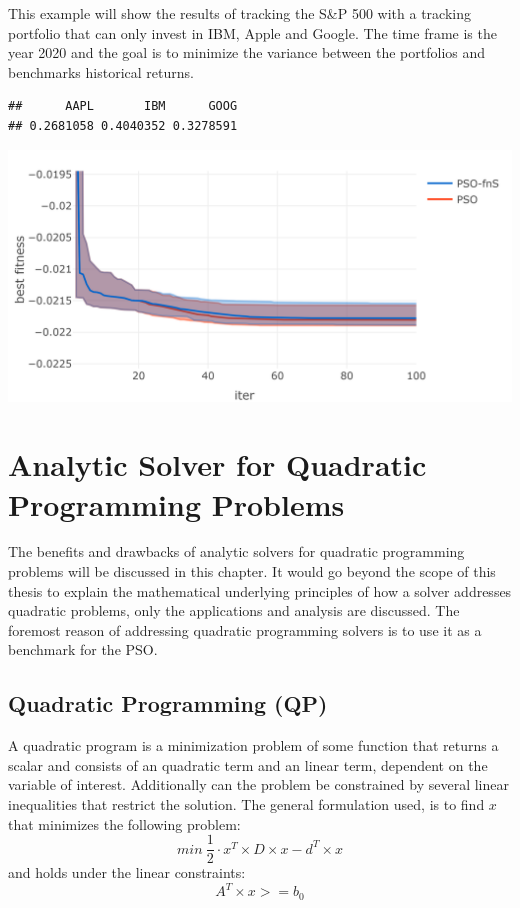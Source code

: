 \documentclass[
  oneside]{book}
\begin{document}
This example will show the results of tracking the S\&P 500 with a tracking portfolio that can only invest in IBM, Apple and Google. The time frame is the year 2020 and the goal is to minimize the variance between the portfolios and benchmarks historical returns.

\begin{verbatim}
##      AAPL       IBM      GOOG 
## 0.2681058 0.4040352 0.3278591
\end{verbatim}

\includegraphics{Master_Thesis_files/figure-latex/unnamed-chunk-10-1.png}

\hypertarget{analytic-solver-for-quadratic-programming-problems}{%
\chapter{Analytic Solver for Quadratic Programming Problems}\label{analytic-solver-for-quadratic-programming-problems}}

The benefits and drawbacks of analytic solvers for quadratic programming problems will be discussed in this chapter. It would go beyond the scope of this thesis to explain the mathematical underlying principles of how a solver addresses quadratic problems, only the applications and analysis are discussed. The foremost reason of addressing quadratic programming solvers is to use it as a benchmark for the PSO.

\hypertarget{quadratic-programming-qp}{%
\section{Quadratic Programming (QP)}\label{quadratic-programming-qp}}

A quadratic program is a minimization problem of some function that returns a scalar and consists of an quadratic term and an linear term, dependent on the variable of interest. Additionally can the problem be constrained by several linear inequalities that restrict the solution. The general formulation used, is to find \(x\) that minimizes the following problem:
\[
  min \ \frac{1}{2} \cdot x^T \times D \times x - d^T \times x 
\]
and holds under the linear constraints:
\[
  A^T \times x >= b_0
\]
\end{document}
